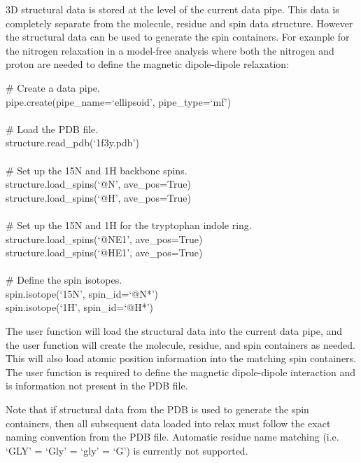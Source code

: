 3D structural data is stored at the level of the current data pipe.  This data is completely separate from the molecule, residue and spin data structure.  However the structural data can be used to generate the spin containers.  For example for the nitrogen relaxation in a model-free analysis where both the nitrogen and proton are needed to define the magnetic dipole-dipole relaxation:

\begin{exampleenv}
\# Create a data pipe. \\
pipe.create(pipe\_name=`ellipsoid', pipe\_type=`mf') \\
 \\
\# Load the PDB file. \\
structure.read\_pdb(`1f3y.pdb') \\
 \\
\# Set up the 15N and 1H backbone spins. \\
structure.load\_spins(`@N', ave\_pos=True) \\
structure.load\_spins(`@H', ave\_pos=True) \\
 \\
\# Set up the 15N and 1H for the tryptophan indole ring. \\
structure.load\_spins(`@NE1', ave\_pos=True) \\
structure.load\_spins(`@HE1', ave\_pos=True) \\
 \\
\# Define the spin isotopes. \\
spin.isotope(`15N', spin\_id=`@N*') \\
spin.isotope(`1H', spin\_id=`@H*')
\end{exampleenv}

The  user function will load the structural data into the current data pipe, and the  user function will create the molecule, residue, and spin containers as needed.  This will also load atomic position information into the matching spin containers.  The  user function is required to define the magnetic dipole-dipole interaction and is information not present in the PDB file.

Note that if structural data from the PDB is used to generate the spin containers, then all subsequent data loaded into relax must follow the exact naming convention from the PDB file.  Automatic residue name matching (i.e. `GLY' = `Gly' = `gly' = `G') is currently not supported.



